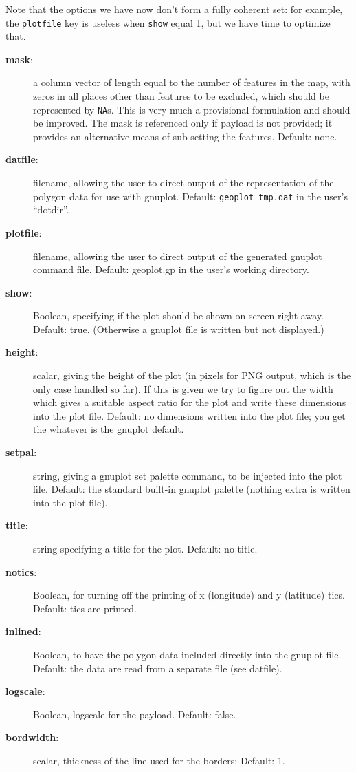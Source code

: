 \documentclass[a4paper]{article}
\begin{document}
Note that the options we have now don't form a fully coherent set: for
example, the \texttt{plotfile} key is useless when \texttt{show} equal
1, but we have time to optimize that.
\begin{description}
\item[\textbf{mask}:] a column vector of length equal to the number of
  features in the map, with zeros in all places other than features to
  be excluded, which should be represented by \texttt{NA}s. This is
  very much a provisional formulation and should be improved. The mask
  is referenced only if payload is not provided; it provides an
  alternative means of sub-setting the features. Default: none.
\item[\textbf{datfile}:] filename, allowing the user to direct
  output of the representation of the polygon data for use with
  gnuplot. Default: \texttt{geoplot\_tmp.dat} in the user’s “dotdir”.
\item[\textbf{plotfile}:] filename, allowing the user to direct output
  of the generated gnuplot command file. Default: geoplot.gp in the
  user’s working directory.
\item[\textbf{show}:] Boolean, specifying if the plot should be shown
  on-screen right away. Default: true. (Otherwise a gnuplot file is
  written but not displayed.)
\item[\textbf{height}:] scalar, giving the height of the plot (in
  pixels for PNG output, which is the only case handled so far). If
  this is given we try to figure out the width which gives a suitable
  aspect ratio for the plot and write these dimensions into the plot
  file. Default: no dimensions written into the plot file; you get the
  whatever is the gnuplot default.
\item[\textbf{setpal}:] string, giving a gnuplot set palette command,
  to be injected into the plot file.  Default: the standard built-in
  gnuplot palette (nothing extra is written into the plot file).
\item[\textbf{title}:] string specifying a title for the
  plot. Default: no title.
\item[\textbf{notics}:] Boolean, for turning off the printing of x
  (longitude) and y (latitude) tics. Default: tics are printed.
\item[\textbf{inlined}:] Boolean, to have the polygon data included
  directly into the gnuplot file. Default: the data are read from a
  separate file (see datfile).
\item[\textbf{logscale}:] Boolean, logscale for the payload. Default: false.
\item[\textbf{bordwidth}:] scalar, thickness of the line used for the
  borders: Default: 1.
\end{description}
\end{document}

